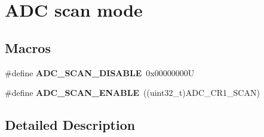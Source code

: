 \hypertarget{group___a_d_c___scan__mode}{}\section{A\+DC scan mode}
\label{group___a_d_c___scan__mode}
\subsection*{Macros}
\begin{DoxyCompactItemize}
\item 
\mbox{\label{group___a_d_c___scan__mode_ga6e269121b26e999155863ce52c522883}} 
\#define {\bfseries A\+D\+C\+\_\+\+S\+C\+A\+N\+\_\+\+D\+I\+S\+A\+B\+LE}~0x00000000U
\item 
\mbox{\label{group___a_d_c___scan__mode_ga1e109b8619961829ff2bc368c1725382}} 
\#define {\bfseries A\+D\+C\+\_\+\+S\+C\+A\+N\+\_\+\+E\+N\+A\+B\+LE}~((uint32\+\_\+t)A\+D\+C\+\_\+\+C\+R1\+\_\+\+S\+C\+AN)
\end{DoxyCompactItemize}


\subsection{Detailed Description}
